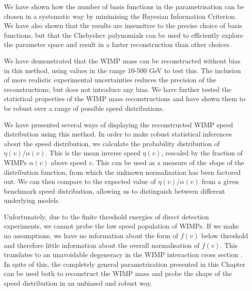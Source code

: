 We have shown how the number of basis functions in the parametrisation can be chosen in a systematic way by minimising the Bayesian Information Criterion. We have also shown that the results are insensitive to the precise choice of basis functions, but that the Chebyshev polynomials can be used to efficiently explore the parameter space and result in a faster reconstruction than other choices. 

We have demonstrated that the WIMP mass can be reconstructed without bias in this method, using values in the range 10-500 GeV to test this. The inclusion of more realistic experimental uncertainties reduces the precision of the reconstructions, but does not introduce any bias. We have further tested the statistical properties of the WIMP mass reconstructions and have shown them to be robust over a range of possible speed distributions.

 We have presented several ways of displaying the reconstructed WIMP speed distribution using this method. In order to make robust statistical inferences about the speed distribution, we calculate the probability distribution of $\eta(v)/\alpha(v)$. This is the mean inverse speed $\eta(v)$, rescaled by the fraction of WIMPs $\alpha(v)$ above speed $v$. This can be used as a measure of the \textit{shape} of the distribution function, from which the unknown normalization has been factored out. We can then compare to the expected value of $\eta(v)/\alpha(v)$ from a given benchmark speed distribution, allowing us to distinguish between different underlying models.

Unfortunately, due to the finite threshold energies of direct detection experiments, we cannot probe the low speed population of WIMPs. If we make no assumptions, we have no information about the form of $f(v)$ below threshold and therefore little information about the overall normalisation of $f(v)$. This translates to an unavoidable degeneracy in the WIMP interaction cross section \sigmapsi. In spite of this, the completely general parametrisation presented in this Chapter can be used both to reconstruct the WIMP mass and probe the shape of the speed distribution in an unbiased and robust way.

